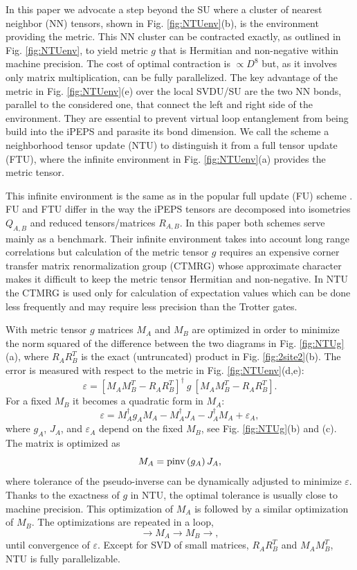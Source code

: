 \documentclass[prb,twocolumn,showkeys,showpacs,amsmath,amsfonts,floatfix,superscriptaddress,nofootinbib]{revtex4-1}
\def\be{\begin{equation}}
\def\ee{\end{equation}}
\begin{document}
In this paper we advocate a step beyond the SU where a cluster of nearest neighbor (NN) tensors, shown in Fig. \ref{fig:NTUenv}(b), is the environment providing the metric. This NN cluster can be contracted exactly, as outlined in Fig. \ref{fig:NTUenv}, to yield metric $g$ that is Hermitian and non-negative within machine precision. The cost of optimal contraction is $\propto D^{8}$ but, as it involves only matrix multiplication, can be fully parallelized. The key advantage of the metric in Fig. \ref{fig:NTUenv}(e) over the local SVDU/SU are the two NN bonds, parallel to the considered one, that connect the left and right side of the environment. They are essential to prevent virtual loop entanglement from being build into the iPEPS and parasite its bond dimension. We call the scheme a neighborhood tensor update (NTU) to distinguish it from a full tensor update (FTU), where the infinite environment in Fig. \ref{fig:NTUenv}(a) provides the metric tensor. 

This infinite environment is the same as in the popular full update (FU) scheme \cite{Orus_review_14}. FU and FTU differ in the way the iPEPS tensors are decomposed into isometries $Q_{A,B}$ and reduced tensors/matrices $R_{A,B}$. In this paper both schemes serve mainly as a benchmark. Their infinite environment takes into account long range correlations but calculation of the metric tensor $g$ requires an expensive corner transfer matrix renormalization group (CTMRG) \cite{Orus_review_14} whose approximate character makes it difficult to keep the metric tensor Hermitian and non-negative. In NTU the CTMRG is used only for calculation of expectation values which can be done less frequently and may require less precision than the Trotter gates. 

With metric tensor $g$ matrices $M_A$ and $M_B$ are optimized in order to minimize the norm squared of the difference between the two diagrams in Fig. \ref{fig:NTUg}(a), where $R_A R_B^T$ is the exact (untruncated) product in Fig. \ref{fig:2site2}(b). The error is measured with respect to the metric in Fig. \ref{fig:NTUenv}(d,e):
\be 
\varepsilon=\left[M_AM_B^T-R_AR_B^T\right]^\dag ~ g ~ \left[M_AM_B^T-R_AR_B^T\right].
\ee 
For a fixed $M_B$ it becomes a quadratic form in $M_A$:
\be 
\varepsilon = M_A^\dag g_A M_A - M_A^\dag J_A - J_A^\dag M_A + \varepsilon_A,
\ee 
where $g_A$, $J_A$, and $\varepsilon_A$ depend on the fixed $M_B$, see Fig. \ref{fig:NTUg}(b) and (c). The matrix is optimized as
\be 
M_A={\rm pinv}\left(g_A\right)J_A,
\ee 
where tolerance of the pseudo-inverse can be dynamically adjusted to minimize $\varepsilon$. Thanks to the exactness of $g$ in NTU, the optimal tolerance is usually close to machine precision. This optimization of $M_A$ is followed by a similar optimization of $M_B$. The optimizations are repeated in a loop,
\be 
\rightarrow M_A \rightarrow M_B \rightarrow,
\ee 
until convergence of $\varepsilon$. Except for SVD of small matrices, $R_AR_B^T$ and $M_AM_B^T$, NTU is fully parallelizable. 
\end{document}
